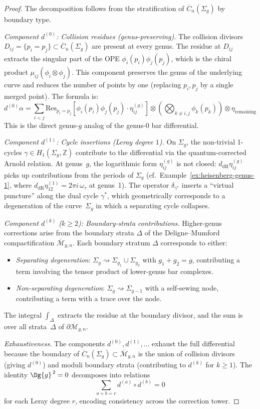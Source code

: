 \begin{proof}
The decomposition follows from the stratification of $\overline{C}_n(\Sigma_g)$ by boundary type.

\emph{Component $d^{(0)}$: Collision residues (genus-preserving).}
The collision divisors $D_{ij} = \{p_i = p_j\} \subset \overline{C}_n(\Sigma_g)$ are present at every genus. The residue at $D_{ij}$ extracts the singular part of the OPE $\phi_i(p_i) \phi_j(p_j)$, which is the chiral product $\mu_{ij}(\phi_i \otimes \phi_j)$. This component preserves the genus of the underlying curve and reduces the number of points by one (replacing $p_i, p_j$ by a single merged point). The formula is:
\[
d^{(0)}\alpha = \sum_{i<j} \mathrm{Res}_{p_i = p_j}\!\left[\phi_i(p_i) \phi_j(p_j) \cdot \eta_{ij}^{(g)}\right] \otimes \left(\bigotimes_{k \neq i,j} \phi_k(p_k)\right) \otimes \eta_{\mathrm{remaining}}
\]
This is the direct genus-$g$ analog of the genus-0 bar differential.

\emph{Component $d^{(1)}$: Cycle insertions (Leray degree $1$).}
On $\Sigma_g$, the non-trivial 1-cycles $\gamma \in H_1(\Sigma_g, \mathbb{Z})$ contribute to the differential via the quantum-corrected Arnold relation. At genus~$g$, the logarithmic form $\eta_{ij}^{(g)}$ is not closed: $d_{\mathrm{dR}}\eta_{ij}^{(g)}$ picks up contributions from the periods of $\Sigma_g$ (cf.\ Example~\ref{ex:heisenberg-genus-1}, where $d_{\mathrm{dR}}\eta_{12}^{(1)} = 2\pi i\, \omega_\tau$ at genus~1). The operator $\delta_{\gamma^*}$ inserts a ``virtual puncture'' along the dual cycle $\gamma^*$, which geometrically corresponds to a degeneration of the curve~$\Sigma_g$ in which a separating cycle collapses.

\emph{Component $d^{(k)}$ ($k \ge 2$): Boundary-strata contributions.}
Higher-genus corrections arise from the boundary strata $\Delta$ of the Deligne--Mumford compactification $\overline{\mathcal{M}}_{g,n}$. Each boundary stratum $\Delta$ corresponds to either:
\begin{itemize}
\item \emph{Separating degeneration}: $\Sigma_g \rightsquigarrow \Sigma_{g_1} \cup \Sigma_{g_2}$ with $g_1 + g_2 = g$, contributing a term involving the tensor product of lower-genus bar complexes.
\item \emph{Non-separating degeneration}: $\Sigma_g \rightsquigarrow \Sigma_{g-1}$ with a self-sewing node, contributing a term with a trace over the node.
\end{itemize}
The integral $\int_\Delta$ extracts the residue at the boundary divisor, and the sum is over all strata~$\Delta$ of $\partial\overline{\mathcal{M}}_{g,n}$.

\emph{Exhaustiveness.} The components $d^{(0)}, d^{(1)}, \ldots$ exhaust the full differential because the boundary of $\overline{C}_n(\Sigma_g) \subset \overline{\mathcal{M}}_{g,n}$ is the union of collision divisors (giving $d^{(0)}$) and moduli boundary strata (contributing to $d^{(k)}$ for $k \ge 1$). The identity $\Dg{g}^{\,2} = 0$ decomposes into relations
\[
\sum_{a+b=r} d^{(a)} \circ d^{(b)} = 0
\]
for each Leray degree $r$, encoding consistency across the correction tower.
\end{proof}

